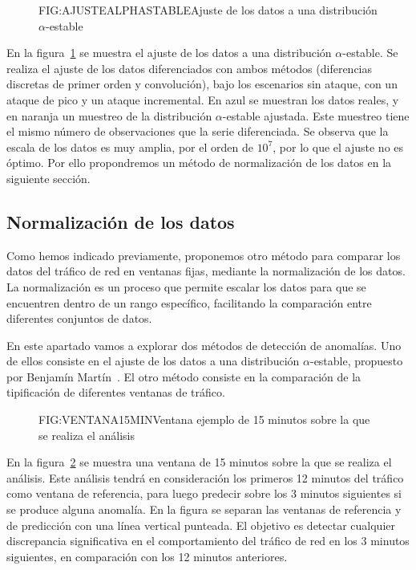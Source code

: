 \begin{figure}[Ajuste de los datos a una distribución $\alpha$-estable]{FIG:AJUSTEALPHASTABLE}{Ajuste de los datos a una distribución $\alpha$-estable}
    \label{FIG:AJUSTEALPHASTABLE}
\end{figure}

En la figura~\ref{FIG:AJUSTEALPHASTABLE} se muestra el ajuste de los datos a una distribución $\alpha$-estable. Se realiza el ajuste de los datos diferenciados con ambos métodos (diferencias discretas de primer orden y convolución), bajo los escenarios sin ataque, con un ataque de pico y un ataque incremental. En azul se muestran los datos reales, y en naranja un muestreo de la distribución $\alpha$-estable ajustada. Este muestreo tiene el mismo número de observaciones que la serie diferenciada.
Se observa que la escala de los datos es muy amplia, por el orden de $10^7$, por lo que el ajuste no es óptimo. Por ello propondremos un método de normalización de los datos en la siguiente sección.

\subsection{Normalización de los datos}

Como hemos indicado previamente, proponemos otro método para comparar los datos del tráfico de red en ventanas fijas, mediante la normalización de los datos. La normalización es un proceso que permite escalar los datos para que se encuentren dentro de un rango específico, facilitando la comparación entre diferentes conjuntos de datos.

En este apartado vamos a explorar dos métodos de detección de anomalías. Uno de ellos consiste en el ajuste de los datos a una distribución $\alpha$-estable, propuesto por Benjamín Martín~\cite{benjamin2021}. El otro método consiste en la comparación de la tipificación de diferentes ventanas de tráfico.

\begin{figure}[Ventana ejemplo de 15 minutos sobre la que se realiza el análisis]{FIG:VENTANA15MIN}{Ventana ejemplo de 15 minutos sobre la que se realiza el análisis}
    \label{FIG:VENTANA15MIN}
\end{figure}

En la figura~\ref{FIG:VENTANA15MIN} se muestra una ventana de 15 minutos sobre la que se realiza el análisis. Este análisis tendrá en consideración los primeros 12 minutos del tráfico como ventana de referencia, para luego predecir sobre los 3 minutos siguientes si se produce alguna anomalía. En la figura se separan las ventanas de referencia y de predicción con una línea vertical punteada. El objetivo es detectar cualquier discrepancia significativa en el comportamiento del tráfico de red en los 3 minutos siguientes, en comparación con los 12 minutos anteriores.

